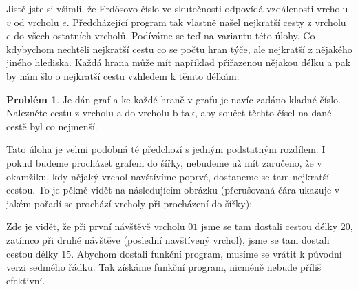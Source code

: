\documentclass[a4paper,10pt,oneside]{article}
\theoremstyle{definition}
\newtheorem{question}[subsection]{Problém}
\begin{document}
Jistě jste si všimli, že Erdösovo číslo ve skutečnosti odpovídá vzdálenosti vrcholu $v$ od vrcholu $e$. Předcházející program tak vlastně našel
nejkratší cesty z vrcholu $e$ do všech ostatních vrcholů. Podíváme se teď na variantu této úlohy. Co kdybychom nechtěli nejkratší cestu co se počtu
hran týče, ale nejkratší z nějakého jiného hlediska. Každá hrana může mít například přiřazenou nějakou délku a pak by nám šlo o nejkratší cestu
vzhledem k těmto délkám:

\begin{question} Je dán graf a ke každé hraně v grafu je navíc zadáno kladné číslo. Nalezněte cestu z vrcholu a do vrcholu b tak, 
aby součet těchto čísel na dané cestě byl co nejmenší.
\end{question}

Tato úloha je velmi podobná té předchozí s jedným podstatným rozdílem. I pokud budeme procházet grafem do šířky, nebudeme už mít zaručeno, že
v okamžiku, kdy nějaký vrchol navštívíme poprvé, dostaneme se tam nejkratší cestou. To je pěkně vidět na následujícím obrázku (přerušovaná čára
ukazuje v jakém pořadí se prochází vrcholy při procházení do šířky):


\begin{center}
\end{center}

Zde je vidět, že při první návštěvě vrcholu $01$ jsme se tam dostali cestou délky 20, zatímco při druhé návštěve (poslední navštívený
vrchol), jsme se tam dostali cestou délky 15. Abychom dostali funkční program, musíme se vrátit k původní verzi sedmého řádku. Tak získáme
funkční program, nicméně nebude příliš efektivní.
\end{document}
